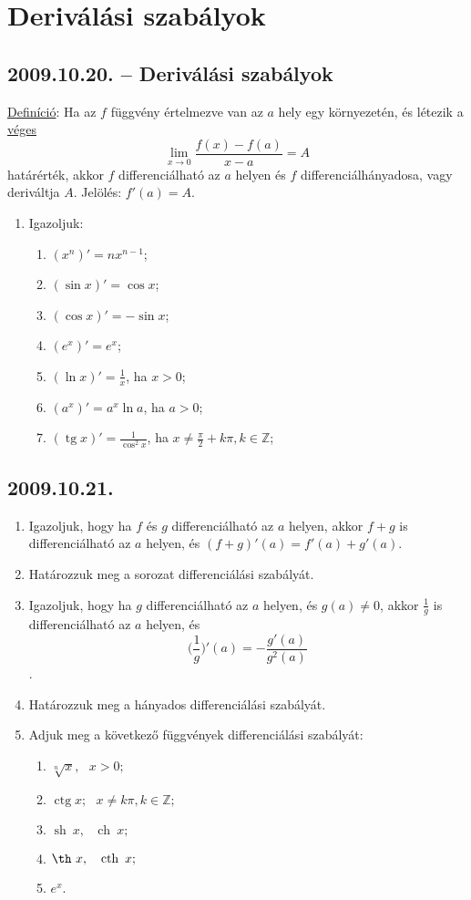 \documentclass{article}
\newenvironment{abc}{\begin{enumerate}[label=\textit{\alph*})]}{\end{enumerate}}
\newcommand{\tg}{\mathop{\mathrm{tg}}\nolimits}
\newcommand{\ctg}{\mathop{\mathrm{ctg}}\nolimits}
\newcommand{\sh}{\mathop{\mathrm{sh}}\nolimits}
\newcommand{\ch}{\mathop{\mathrm{ch}}\nolimits}
\newcommand{\cth}{\mathop{\mathrm{cth}}\nolimits}
\begin{document}
\section*{Deriválási szabályok}

\subsection*{2009.10.20. -- Deriválási szabályok}
\underline{Definíció}: Ha az $f$ függvény értelmezve van az \underline{$a$} hely egy 								környezetén, és létezik a \underline{véges} 
						\[ \lim_{x \to 0} \frac{f(x)-f(a)}{x-a} = A \]
						határérték, akkor $f$ differenciálható az \underline{$a$} helyen 							és $f$ differenciálhányadosa, vagy deriváltja $A$. Jelölés: 								$f'(a)=A$.

\begin{enumerate}
\item Igazoljuk:
	\begin{abc}
	\item $(x^n)'=nx^{n-1} $;
	\item $(\sin x)'=\cos x $;
	\item $(\cos x)'=-\sin x $;
	\item $(e^x)'=e^x $;
	\item $(\ln x)'=\frac{1}{x}$, ha $x>0 $;
	\item $(a^x)'=a^x \ln a$, ha $a>0$;
	\item $(\tg x)'=\frac{1}{\cos^2 x}$, ha $x \neq \frac{\pi}{2}+k\pi, k\in \mathbb{Z} $;
	\end{abc}

\end{enumerate}

\subsection*{2009.10.21.}
\begin{enumerate}
\item Igazoljuk, hogy ha $f$ és $g$ differenciálható az \underline{$a$} helyen, akkor $f+g		$ is differenciálható az \underline{$a$} helyen, és $(f+g)'(a)=f'(a)+g'(a)$.
\item Határozzuk meg a sorozat differenciálási szabályát.
\item Igazoljuk, hogy ha $g$ differenciálható az \underline{$a$} helyen, és $g(a)\neq 0$, 		akkor $\frac{1}{g}$ is differenciálható az \underline{$a$} helyen, és 
	\[ \bigg(\frac{1}{g}\bigg)'(a)=-\frac{g'(a)}{g^2(a)} \].
\item Határozzuk meg a hányados differenciálási szabályát.
\item Adjuk meg a következő függvények differenciálási szabályát:
	\begin{abc}
	\item $\sqrt[n]{x},~~~ x>0;$
	\item $\ctg x;~~~x\neq k\pi, k\in \mathbb{Z};$
	\item $\sh~x,~~~ \ch~x;$
	\item $\th~x,~~~ \cth~x;$
	\item $e^x$.
	\end{abc}
\end{enumerate}
\end{document}
